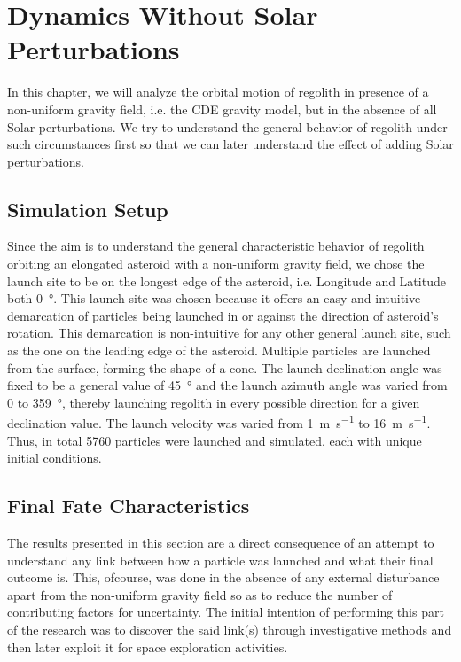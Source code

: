 \chapter{Dynamics Without Solar Perturbations}
\label{chap:dynamics_without_solar_perturbations}
\graphicspath{{Results/}}

In this chapter, we will analyze the orbital motion of regolith in presence of a non-uniform gravity field, i.e. the \gls{CDE} gravity model, but in the absence of all Solar perturbations. We try to understand the general behavior of regolith under such circumstances first so that we can later understand the effect of adding Solar perturbations.

\section{Simulation Setup}
\label{sec:simulation_setup_noSP}
Since the aim is to understand the general characteristic behavior of regolith orbiting an elongated asteroid with a non-uniform gravity field, we chose the launch site to be on the longest edge of the asteroid, i.e. Longitude and Latitude both \SI{0}{\degree}. This launch site was chosen because it offers an easy and intuitive demarcation of particles being launched in or against the direction of asteroid's rotation. This demarcation is non-intuitive for any other general launch site, such as the one on the leading edge of the asteroid.
%
\newline\newline
%
Multiple particles are launched from the surface, forming the shape of a cone. The launch declination angle was fixed to be a general value of \SI{45}{\degree} and the launch azimuth angle was varied from 0 to \SI{359}{\degree}, thereby launching regolith in every possible direction for a given declination value. The launch velocity was varied from \SI{1}{\metre \per \second} to \SI{16}{\metre \per \second}. Thus, in total 5760 particles were launched and simulated, each with unique initial conditions.

\section{Final Fate Characteristics}
\label{sec:final_fate_characteristics_noSP}
The results presented in this section are a direct consequence of an attempt to understand any link between how a particle was launched and what their final outcome is. This, ofcourse, was done in the absence of any external disturbance apart from the non-uniform gravity field so as to reduce the number of contributing factors for uncertainty. The initial intention of performing this part of the research was to discover the said link(s) through investigative methods and then later exploit it for space exploration activities.

